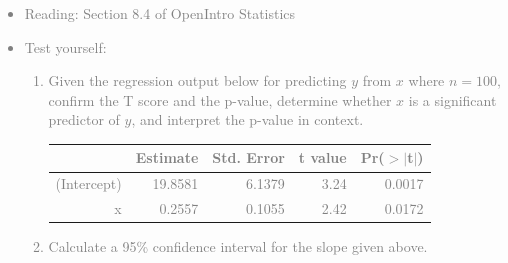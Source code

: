 \documentclass[11pt]{article}
\newcommand{\gray}[1]{\textcolor{gray}{#1}}
\begin{document}
\gray{
{\it
\vspace{-0.55cm}
\begin{itemize}
\renewcommand{\labelitemi}{{\textcolor{dark}{$\ast$}}}
\item Reading: Section 8.4 of OpenIntro Statistics
\item Test yourself: 
\begin{enumerate}
\item Given the regression output below for predicting $y$ from $x$ where $n = 100$, confirm the T score and the p-value, determine whether $x$ is a significant predictor of $y$, and interpret the p-value in context.
\begin{center}
\begin{tabular}{rrrrr}
  \hline
 & Estimate & Std. Error & t value & Pr($>$$|$t$|$) \\ 
  \hline
(Intercept) & 19.8581 & 6.1379 & 3.24 & 0.0017 \\ 
  x & 0.2557 & 0.1055 & 2.42 & 0.0172 \\ 
   \hline
\end{tabular}
\end{center}
\item Calculate a 95\% confidence interval for the slope given above.
\end{enumerate}
\end{itemize}
}}
\end{document}
